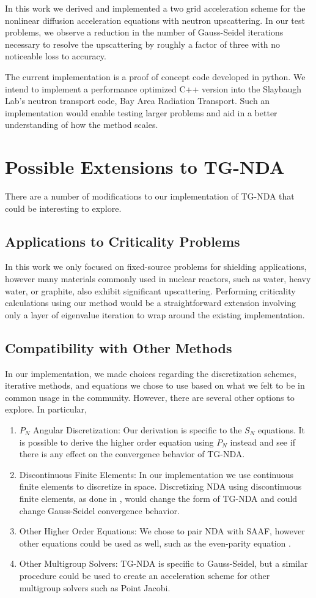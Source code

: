 
In this work we derived and implemented a two grid acceleration scheme for the nonlinear diffusion acceleration equations with neutron upscattering. In our test problems, we observe a reduction in the number of Gauss-Seidel iterations necessary to resolve the upscattering by roughly a factor of three with no noticeable loss to accuracy. 

The current implementation is a proof of concept code developed in python. We intend to implement a performance optimized C++ version into the Slaybaugh Lab's neutron transport code, Bay Area Radiation Transport. Such an implementation would enable testing larger problems and aid in a better understanding of how the method scales.

\section{Possible Extensions to TG-NDA}
There are a number of modifications to our implementation of TG-NDA that could be interesting to explore. 


\subsection{Applications to Criticality Problems}
In this work we only focused on fixed-source problems for shielding applications, however many materials commonly used in nuclear reactors, such as water, heavy water, or graphite, also exhibit significant upscattering. Performing criticality calculations using our method would be a straightforward extension involving only a layer of eigenvalue iteration to wrap around the existing implementation. 


\subsection{Compatibility with Other Methods}
In our implementation, we made choices regarding the discretization schemes, iterative methods, and equations we chose to use based on what we felt to be in common usage in the community. However, there are several other options to explore. In particular, 
\begin{enumerate}
\item $P_N$ Angular Discretization:
Our derivation is specific to the $S_N$ equations. It is possible to derive the higher order equation using $P_N$ instead \cite{zheng-thesis} and see if there is any effect on the convergence behavior of TG-NDA. 
\item Discontinuous Finite Elements:
In our implementation we use continuous finite elements to discretize in space. Discretizing NDA using discontinuous finite elements, as done in \cite{Schunert2017}, would change the form of TG-NDA and could change Gauss-Seidel convergence behavior. 
\item Other Higher Order Equations:
We chose to pair NDA with SAAF, however other equations could be used as well, such as the even-parity equation \cite{Noh1996}.
\item Other Multigroup Solvers:
TG-NDA is specific to Gauss-Seidel, but a similar procedure could be used to create an acceleration scheme for other multigroup solvers such as Point Jacobi.
\end{enumerate}
